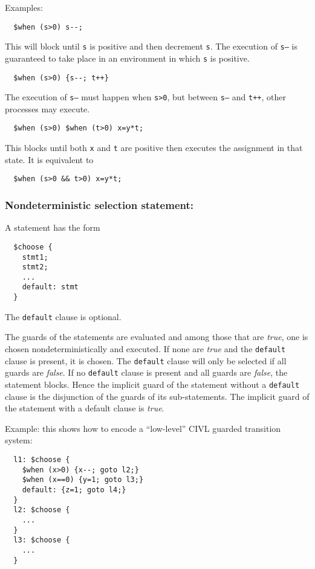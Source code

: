Examples:
\begin{verbatim}
  $when (s>0) s--;
\end{verbatim}
This will block until \texttt{s} is positive and then decrement
\texttt{s}.  The execution of \texttt{s--} is guaranteed to take place
in an environment in which \texttt{s} is positive.

\begin{verbatim}
  $when (s>0) {s--; t++}
\end{verbatim}
The execution of \texttt{s--} must happen when \texttt{s>0}, but
between \texttt{s--} and \texttt{t++}, other processes may execute.

\begin{verbatim}
  $when (s>0) $when (t>0) x=y*t;
\end{verbatim}
This blocks until both \texttt{x} and \texttt{t} are positive then
executes the assignment in that state.  It is equivalent to
\begin{verbatim}
  $when (s>0 && t>0) x=y*t;
\end{verbatim}

\subsubsection{Nondeterministic selection statement: \cchoose}

A \cchoose{} statement has the form
\begin{verbatim}
  $choose {
    stmt1;
    stmt2;
    ...
    default: stmt
  }
\end{verbatim}
The \texttt{default} clause is optional.

The guards of the statements are evaluated and among those that are
\emph{true}, one is chosen nondeterministically and executed.  If none
are \emph{true} and the \texttt{default} clause is present, it is
chosen.  The \texttt{default} clause will only be selected if all
guards are \emph{false}.  If no \texttt{default} clause is present and
all guards are \emph{false}, the statement blocks.  Hence the implicit
guard of the \cchoose{} statement without a \texttt{default} clause is
the disjunction of the guards of its sub-statements.  The implicit
guard of the \cchoose{} statement with a default clause is
\emph{true}.

Example: this shows how to encode a ``low-level'' CIVL guarded
transition system:

\begin{verbatim}
  l1: $choose {
    $when (x>0) {x--; goto l2;}
    $when (x==0) {y=1; goto l3;}
    default: {z=1; goto l4;}
  }
  l2: $choose {
    ...
  }
  l3: $choose {
    ...
  }
\end{verbatim}


